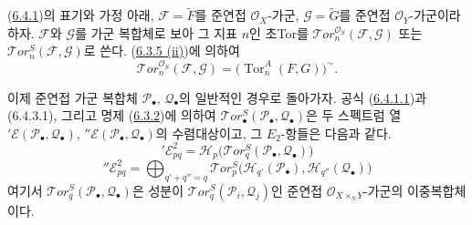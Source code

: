 \begin{env}[6.4.3]
\label{III.6.4.3-fr}
(\hyperref[III.6.4.1-fr]{6.4.1})의 표기와 가정 아래,
$\mathscr F=\widetilde F$를 준연접 $\mathscr O_X$-가군,
$\mathscr G=\widetilde G$를 준연접 $\mathscr O_Y$-가군이라 하자.
$\mathscr F$와 $\mathscr G$를 가군 복합체로 보아 그 지표 $n$인 초Tor를
$\mathscr{T}\!or_n^{\mathscr O_S}(\mathscr F,\mathscr G)$ 또는
$\mathscr{T}\!or_n^S(\mathscr F,\mathscr G)$로 쓴다.
(\hyperref[III.6.3.5-fr]{6.3.5 (ii)})에 의하여
\[
  \mathscr{T}\!or_n^{\mathscr O_S}(\mathscr F,\mathscr G)
  =\bigl(\operatorname{Tor}_n^A(F,G)\bigr)^{\sim}.
  \tag{6.4.3.1}\label{III.6.4.3.1.fr}
\]

이제 준연접 가군 복합체 $\mathscr P_\bullet$,
$\mathscr Q_\bullet$의 일반적인 경우로 돌아가자. 공식
(\hyperref[III.6.4.1.1.fr]{6.4.1.1})과 (6.4.3.1), 그리고 명제
(\hyperref[III.6.3.2-fr]{6.3.2})에 의하여
$\mathscr{T}\!or_\bullet^S(\mathscr P_\bullet,\mathscr Q_\bullet)$은 두
스펙트럼 열 $'\mathscr E(\mathscr P_\bullet,\mathscr Q_\bullet)$,
$''\mathscr E(\mathscr P_\bullet,\mathscr Q_\bullet)$의 수렴대상이고,
그 $E_2$-항들은 다음과 같다.
\[
  '\mathscr E_{pq}^2
  =\mathscr H_p\bigl(\mathscr{T}\!or_q^S
    (\mathscr P_\bullet,\mathscr Q_\bullet)\bigr)
  \tag{6.4.3.2}\label{III.6.4.3.2.fr}
\]
\[
  ''\mathscr E_{pq}^2
  =\bigoplus_{q'+q''=q}
  \mathscr{T}\!or_p^S
  \bigl(\mathscr H_{q'}(\mathscr P_\bullet),
        \mathscr H_{q''}(\mathscr Q_\bullet)\bigr)
  \tag{6.4.3.3}\label{III.6.4.3.3.fr}
\]
여기서 $\mathscr{T}\!or_q^S(\mathscr P_\bullet,\mathscr Q_\bullet)$은
성분이 $\mathscr{T}\!or_q^S(\mathscr P_i,\mathscr Q_j)$인 준연접
$\mathscr O_{X\times_S Y}$-가군의 이중복합체이다.
\end{env}

